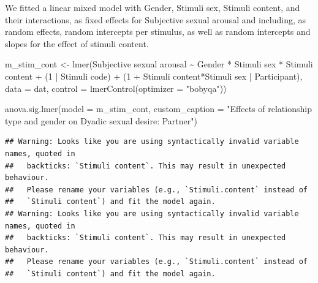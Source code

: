 \documentclass[
  bookmarksnumbered]{article}
\newenvironment{Shaded}{\begin{snugshade}}{\end{snugshade}}
\newcommand{\AttributeTok}[1]{\textcolor[rgb]{0.80,0.80,0.80}{#1}}
\newcommand{\DecValTok}[1]{\textcolor[rgb]{0.86,0.86,0.80}{#1}}
\newcommand{\FunctionTok}[1]{\textcolor[rgb]{0.94,0.94,0.56}{#1}}
\newcommand{\NormalTok}[1]{\textcolor[rgb]{0.80,0.80,0.80}{#1}}
\newcommand{\OtherTok}[1]{\textcolor[rgb]{0.94,0.94,0.56}{#1}}
\newcommand{\SpecialCharTok}[1]{\textcolor[rgb]{0.86,0.64,0.64}{#1}}
\newcommand{\StringTok}[1]{\textcolor[rgb]{0.80,0.58,0.58}{#1}}
\begin{document}
We fitted a linear mixed model with Gender, Stimuli sex, Stimuli content, and their interactions, as fixed effects for Subjective sexual arousal and including, as random effects, random intercepts per stimulus, as well as random intercepts and slopes for the effect of stimuli content.

\begin{Shaded}
\begin{Highlighting}[]
\NormalTok{m\_stim\_cont }\OtherTok{\textless{}{-}} \FunctionTok{lmer}\NormalTok{(}\StringTok{\textasciigrave{}}\AttributeTok{Subjective sexual arousal}\StringTok{\textasciigrave{}} \SpecialCharTok{\textasciitilde{}} 
\NormalTok{             Gender }\SpecialCharTok{*} \StringTok{\textasciigrave{}}\AttributeTok{Stimuli sex}\StringTok{\textasciigrave{}} \SpecialCharTok{*} \StringTok{\textasciigrave{}}\AttributeTok{Stimuli content}\StringTok{\textasciigrave{}} \SpecialCharTok{+}
\NormalTok{             (}\DecValTok{1} \SpecialCharTok{|} \StringTok{\textasciigrave{}}\AttributeTok{Stimuli code}\StringTok{\textasciigrave{}}\NormalTok{) }\SpecialCharTok{+}
\NormalTok{             (}\DecValTok{1} \SpecialCharTok{+} \StringTok{\textasciigrave{}}\AttributeTok{Stimuli content}\StringTok{\textasciigrave{}}\SpecialCharTok{*}\StringTok{\textasciigrave{}}\AttributeTok{Stimuli sex}\StringTok{\textasciigrave{}} \SpecialCharTok{|}\NormalTok{ Participant),}
           \AttributeTok{data =}\NormalTok{ dat,}
           \AttributeTok{control =} \FunctionTok{lmerControl}\NormalTok{(}\AttributeTok{optimizer =} \StringTok{"bobyqa"}\NormalTok{))}

\FunctionTok{anova.sig.lmer}\NormalTok{(}\AttributeTok{model =}\NormalTok{ m\_stim\_cont, }\AttributeTok{custom\_caption =} \StringTok{"Effects of relationship type and gender }
\StringTok{               on Dyadic sexual desire: Partner"}\NormalTok{)}
\end{Highlighting}
\end{Shaded}

\begin{verbatim}
## Warning: Looks like you are using syntactically invalid variable names, quoted in
##   backticks: `Stimuli content`. This may result in unexpected behaviour.
##   Please rename your variables (e.g., `Stimuli.content` instead of
##   `Stimuli content`) and fit the model again.
## Warning: Looks like you are using syntactically invalid variable names, quoted in
##   backticks: `Stimuli content`. This may result in unexpected behaviour.
##   Please rename your variables (e.g., `Stimuli.content` instead of
##   `Stimuli content`) and fit the model again.
\end{verbatim}
\end{document}
